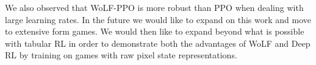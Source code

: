 \documentclass[conference]{IEEEtran}
\begin{document}

We also observed that WoLF-PPO is more robust than PPO when dealing with large learning rates. In the future we would like to expand on this work and move to extensive form games. We would then like to expand beyond what is possible with tabular RL in order to demonstrate both the advantages of WoLF and Deep RL by training on games with raw pixel state representations.





\end{document}
